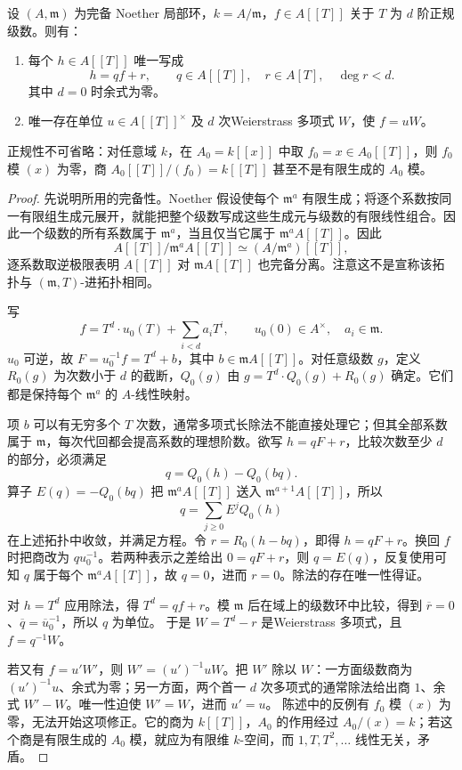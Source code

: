 \begin{theorem}\label{b3:thm:formal-weierstrass}\label{b3:thm:weierstrass-hypothesis-necessary}
	设 \((A,\mathfrak m)\) 为完备 Noether 局部环，\(k=A/\mathfrak m\)，\(f\in A[\![T]\!]\) 关于 \(T\) 为 \(d\) 阶正规级数。则有：
	\begin{enumerate}
		\item 每个 \(h\in A[\![T]\!]\) 唯一写成
			\[
				h=qf+r,\qquad q\in A[\![T]\!],\quad r\in A[T],\quad\deg r<d.
			\]
			其中 \(d=0\) 时余式为零。
		\item 唯一存在单位 \(u\in A[\![T]\!]^\times\) 及 \(d\) 次Weierstrass 多项式 \(W\)，使 \(f=uW\)。
	\end{enumerate}
	正规性不可省略：对任意域 \(k\)，在 \(A_0=k[\![x]\!]\) 中取 \(f_0=x\in A_0[\![T]\!]\)，则 \(f_0\) 模 \((x)\) 为零，商 \(A_0[\![T]\!]/(f_0)=k[\![T]\!]\) 甚至不是有限生成的 \(A_0\) 模。
\end{theorem}
\begin{proof}
	先说明所用的完备性。Noether 假设使每个 \(\mathfrak m^a\) 有限生成；将逐个系数按同一有限组生成元展开，就能把整个级数写成这些生成元与级数的有限线性组合。因此一个级数的所有系数属于 \(\mathfrak m^a\)，当且仅当它属于 \(\mathfrak m^aA[\![T]\!]\)。因此
	\[
		A[\![T]\!]/\mathfrak m^aA[\![T]\!] \simeq(A/\mathfrak m^a)[\![T]\!],
	\]
	逐系数取逆极限表明 \(A[\![T]\!]\) 对 \(\mathfrak m A[\![T]\!]\) 也完备分离。注意这不是宣称该拓扑与 \((\mathfrak m,T)\)-进拓扑相同。

	写
	\[
		f=T^d\cdot u_0(T)+\sum_{i<d}a_iT^i, \qquad u_0(0)\in A^\times,\quad a_i\in\mathfrak m.
	\]
	\(u_0\) 可逆，故 \(F=u_0^{-1}f=T^d+b\)，其中 \(b\in\mathfrak m A[\![T]\!]\)。对任意级数 \(g\)，定义 \(R_0(g)\) 为次数小于 \(d\) 的截断，\(Q_0(g)\) 由 \(g=T^d\cdot Q_0(g)+R_0(g)\) 确定。它们都是保持每个 \(\mathfrak m^a\) 的 \(A\)-线性映射。

	项 \(b\) 可以有无穷多个 \(T\) 次数，通常多项式长除法不能直接处理它；但其全部系数属于 \(\mathfrak m\)，每次代回都会提高系数的理想阶数。欲写 \(h=qF+r\)，比较次数至少 \(d\) 的部分，必须满足
	\[
		q=Q_0(h)-Q_0(bq).
	\]
	算子 \(E(q)=-Q_0(bq)\) 把 \(\mathfrak m^aA[\![T]\!]\) 送入 \(\mathfrak m^{a+1}A[\![T]\!]\)，所以
	\[
		q=\sum_{j\ge0}E^jQ_0(h)
	\]
	在上述拓扑中收敛，并满足方程。令 \(r=R_0(h-bq)\)，即得 \(h=qF+r\)。换回 \(f\) 时把商改为 \(qu_0^{-1}\)。若两种表示之差给出 \(0=qF+r\)，则 \(q=E(q)\)，反复使用可知 \(q\) 属于每个 \(\mathfrak m^aA[\![T]\!]\)，故 \(q=0\)，进而 \(r=0\)。除法的存在唯一性得证。

	对 \(h=T^d\) 应用除法，得 \(T^d=qf+r\)。模 \(\mathfrak m\) 后在域上的级数环中比较，得到 \(\overline r=0\)、\(\overline q=\overline u_0^{-1}\)，所以 \(q\) 为单位。 于是 \(W=T^d-r\) 是Weierstrass 多项式，且 \(f=q^{-1}W\)。

	若又有 \(f=u'W'\)，则 \(W'=(u')^{-1}uW\)。把 \(W'\) 除以 \(W\)：一方面级数商为 \((u')^{-1}u\)、余式为零；另一方面，两个首一 \(d\) 次多项式的通常除法给出商 \(1\)、余式 \(W'-W\)。唯一性迫使 \(W'=W\)，进而 \(u'=u\)。 陈述中的反例有 \(f_0\) 模 \((x)\) 为零，无法开始这项修正。它的商为 \(k[\![T]\!]\)，\(A_0\) 的作用经过 \(A_0/(x)=k\)；若这个商是有限生成的 \(A_0\) 模，就应为有限维 \(k\)-空间，而 \(1,T,T^2,\ldots\) 线性无关，矛盾。
\end{proof}

